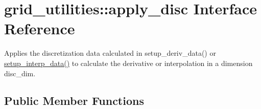 \hypertarget{interfacegrid__utilities_1_1apply__disc}{}\section{grid\+\_\+utilities\+:\+:apply\+\_\+disc Interface Reference}
\label{interfacegrid__utilities_1_1apply__disc}


Applies the discretization data calculated in setup\+\_\+deriv\+\_\+data() or \hyperlink{namespacegrid__utilities_ad059876fabae2c8445e5d3971ba28742}{setup\+\_\+interp\+\_\+data()} to calculate the derivative or interpolation in a dimension {\ttfamily disc\+\_\+dim}.  


\subsection*{Public Member Functions}
